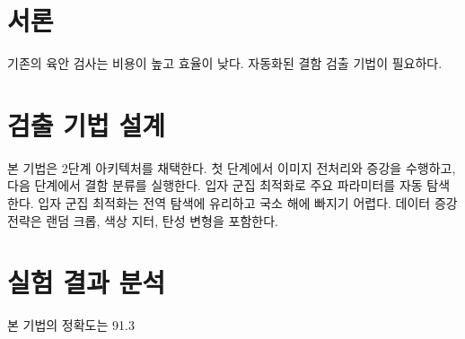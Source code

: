 \documentclass{article}
\begin{document}
\section{서론}
기존의 육안 검사는 비용이 높고 효율이 낮다. 자동화된 결함 검출 기법이 필요하다.
\section{검출 기법 설계}
본 기법은 2단계 아키텍처를 채택한다. 첫 단계에서 이미지 전처리와 증강을 수행하고, 다음 단계에서 결함 분류를 실행한다.
입자 군집 최적화로 주요 파라미터를 자동 탐색한다. 입자 군집 최적화는 전역 탐색에 유리하고 국소 해에 빠지기 어렵다.
데이터 증강 전략은 랜덤 크롭, 색상 지터, 탄성 변형을 포함한다.
\section{실험 결과 분석}
본 기법의 정확도는 91.3%
\end{document}
